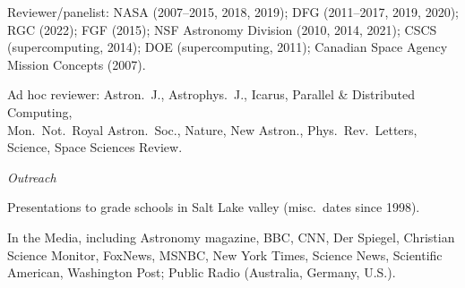 \documentclass[11pt]{article}
\def\ti{}  %
\newcommand{\sheadalt}[1]{\vspace{10pt}\hspace{0.5in}{\it{#1}}}
\begin{document}
\begin{list}{\mbox{}}{%
\setlength{\partopsep}{0.0in}%
\setlength{\itemindent}{-0.3in}%
\setlength{\leftmargin}{0.8in}%
\setlength{\parsep}{-2.75pt}
}
\vspace{-16.5pt}
\item
Reviewer/panelist: NASA (2007--2015, 2018, 2019);
DFG (2011--2017, 2019, 2020);
RGC (2022); %
FGF (2015);
NSF Astronomy Division (2010, 2014, 2021);
CSCS (supercomputing, 2014);
DOE (supercomputing, 2011);
Canadian Space Agency Mission Concepts (2007). 
\item
Ad hoc reviewer: {\ti Astron.\ J.}, {\ti Astrophys.\ J.}, {\ti Icarus},
{\ti Parallel \& Distributed Computing}, \\ 
{\ti Mon.\ Not.\ Royal Astron.\ Soc.},
{\ti Nature}, {\ti New Astron.}, {\ti Phys.~Rev.~Letters}, {\ti Science},
{\ti Space Sciences Review}.
%
\end{list}


\vspace{-2.75pt}
\centerline{\em Outreach}

\begin{list}{\mbox{}}{%
\setlength{\partopsep}{0.0in}%
\setlength{\itemindent}{-0.3in}%
\setlength{\leftmargin}{0.8in}%
\setlength{\parsep}{-2.75pt}
}
\vspace{-16.5pt}
\item
Presentations to grade schools in
Salt Lake valley (misc.\ dates since 1998).
\item
  In the Media, including Astronomy magazine, BBC, CNN, Der Spiegel,
  Christian Science Monitor, FoxNews, MSNBC, New York Times,
  Science News, Scientific American, Washington Post;
Public Radio (Australia, Germany, U.S.).

\end{list}
\end{document}
